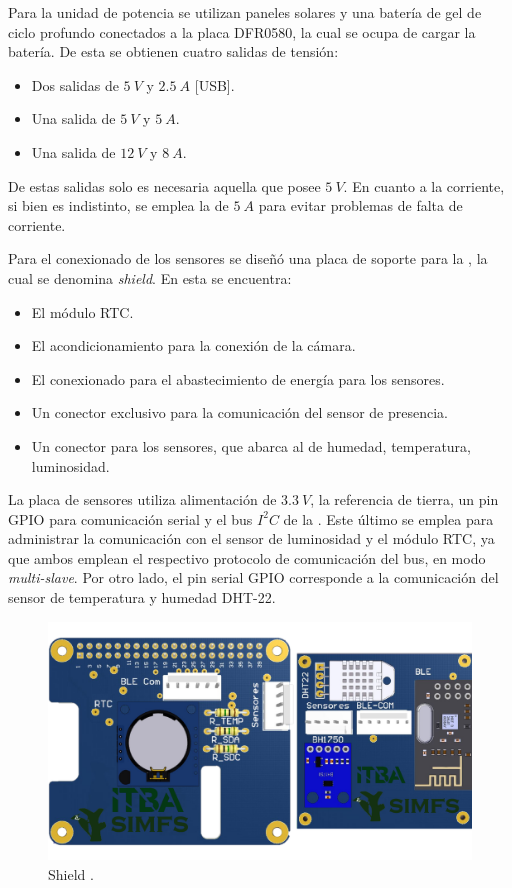 
Para la unidad de potencia se utilizan paneles solares y una batería de gel de ciclo profundo conectados a la placa DFR0580, la cual se ocupa de cargar la batería. De esta se obtienen cuatro salidas de tensión:
\begin{itemize}
	\item Dos salidas de $5 \ V$ y $2.5 \ A$ [USB].
	\item Una salida de $5 \ V$ y $5 \ A$.
	\item Una salida de $12 \ V$ y $8 \ A$.
\end{itemize}
De estas salidas solo es necesaria aquella que posee $5 \ V$. En cuanto a la corriente, si bien es indistinto, se emplea la de $5 \ A$ para evitar problemas de falta de corriente.

Para el conexionado de los sensores se diseñó una placa de soporte para la \rspi, la cual se denomina \textit{shield}. En esta se encuentra:
\begin{itemize}
	\item El módulo RTC.
	\item El acondicionamiento para la conexión de la cámara.
	\item El conexionado para el abastecimiento de energía para los sensores.
	\item Un conector exclusivo para la comunicación del sensor de presencia.
	\item Un conector para los sensores, que abarca al de humedad, temperatura, luminosidad.
\end{itemize}

La placa de sensores utiliza alimentación de $3.3 \ V$, la referencia de tierra, un pin GPIO para comunicación serial y el bus $I^2C$ de la \rpi. Este último se emplea para administrar la comunicación con el sensor de luminosidad y el módulo RTC, ya que ambos emplean el respectivo protocolo de comunicación del bus, en modo \textit{multi-slave}. Por otro lado, el pin serial GPIO corresponde a la comunicación del sensor de temperatura y humedad DHT-22. 
\begin{figure}[H]
	\centering
	\includegraphics[width=0.9\linewidth,page=1]{ImagenesIngenieria de Detalle/RPI}		
	\caption{Shield \rspi.}
	\label{fig:conexionado_Rpi}
\end{figure}

